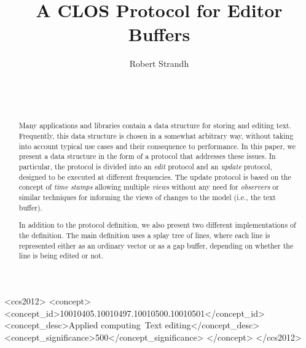 \documentclass{sig-alternate-05-2015}
\def\inputtex#1{}
\begin{document}
\title{A CLOS Protocol for Editor Buffers}
\author{\alignauthor
Robert Strandh\\
\\
\\
\\
}

\maketitle

\begin{abstract}
Many applications and libraries contain a data structure for storing
and editing text.  Frequently, this data structure is chosen in a
somewhat arbitrary way, without taking into account typical use cases
and their consequence to performance.  In this paper, we present a
data structure in the form of a \clos{} protocol that addresses these
issues.  In particular, the protocol is divided into an \emph{edit}
protocol and an \emph{update} protocol, designed to be executed at
different frequencies.  The update protocol is based on the concept of
\emph{time stamps} allowing multiple \emph{views} without any need for
\emph{observers} or similar techniques for informing the views of
changes to the model (i.e., the text buffer).

In addition to the protocol definition, we also present two different
implementations of the definition.  The main definition uses a splay
tree of lines, where each line is represented either as an ordinary
vector or as a gap buffer, depending on whether the line is being
edited or not.
\end{abstract}

\begin{CCSXML}
  <ccs2012>
  <concept>
  <concept_id>10010405.10010497.10010500.10010501</concept_id>
  <concept_desc>Applied computing~Text editing</concept_desc>
  <concept_significance>500</concept_significance>
  </concept>
  </ccs2012>
\end{CCSXML}


\printccsdesc


\inputtex{spec-macros.tex}

\inputtex{sec-introduction.tex}
\inputtex{sec-previous.tex}
\inputtex{sec-our-method.tex}
\inputtex{sec-benefits.tex}
\inputtex{sec-conclusions.tex}
\inputtex{sec-acknowledgments.tex}
\inputtex{app-protocol.tex}



\end{document}
